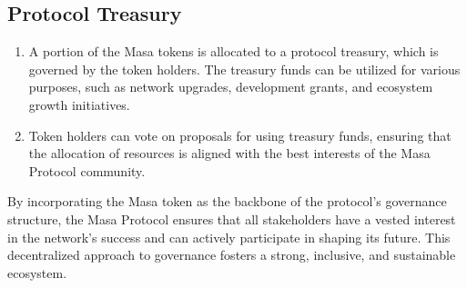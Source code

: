 \documentclass{article}
\begin{document}
\subsection{Protocol Treasury}
\begin{enumerate}
\item A portion of the Masa tokens is allocated to a protocol treasury, which is governed by the token holders. The treasury funds can be utilized for various purposes, such as network upgrades, development grants, and ecosystem growth initiatives.
\item Token holders can vote on proposals for using treasury funds, ensuring that the allocation of resources is aligned with the best interests of the Masa Protocol community.
\end{enumerate}

By incorporating the Masa token as the backbone of the protocol's governance structure, the Masa Protocol ensures that all stakeholders have a vested interest in the network's success and can actively participate in shaping its future. This decentralized approach to governance fosters a strong, inclusive, and sustainable ecosystem.
\end{document}
